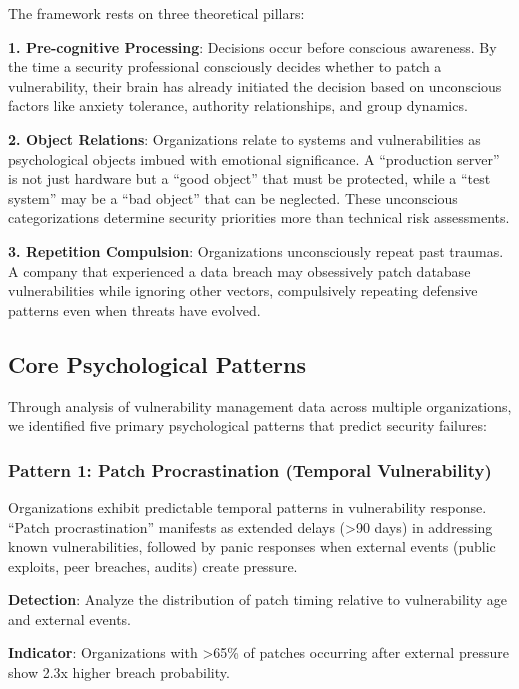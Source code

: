 \documentclass[11pt,a4paper]{article}
\begin{document}
The framework rests on three theoretical pillars:

\textbf{1. Pre-cognitive Processing}: Decisions occur before conscious awareness\cite{libet1983}. By the time a security professional consciously decides whether to patch a vulnerability, their brain has already initiated the decision based on unconscious factors like anxiety tolerance, authority relationships, and group dynamics.

\textbf{2. Object Relations}: Organizations relate to systems and vulnerabilities as psychological objects imbued with emotional significance\cite{klein1946}. A ``production server'' is not just hardware but a ``good object'' that must be protected, while a ``test system'' may be a ``bad object'' that can be neglected. These unconscious categorizations determine security priorities more than technical risk assessments.

\textbf{3. Repetition Compulsion}: Organizations unconsciously repeat past traumas\cite{freud1920}. A company that experienced a data breach may obsessively patch database vulnerabilities while ignoring other vectors, compulsively repeating defensive patterns even when threats have evolved.

\subsection{Core Psychological Patterns}

Through analysis of vulnerability management data across multiple organizations, we identified five primary psychological patterns that predict security failures:

\subsubsection{Pattern 1: Patch Procrastination (Temporal Vulnerability)}

Organizations exhibit predictable temporal patterns in vulnerability response. ``Patch procrastination'' manifests as extended delays (>90 days) in addressing known vulnerabilities, followed by panic responses when external events (public exploits, peer breaches, audits) create pressure.

\textbf{Detection}: Analyze the distribution of patch timing relative to vulnerability age and external events.

\textbf{Indicator}: Organizations with >65\% of patches occurring after external pressure show 2.3x higher breach probability.
\end{document}
